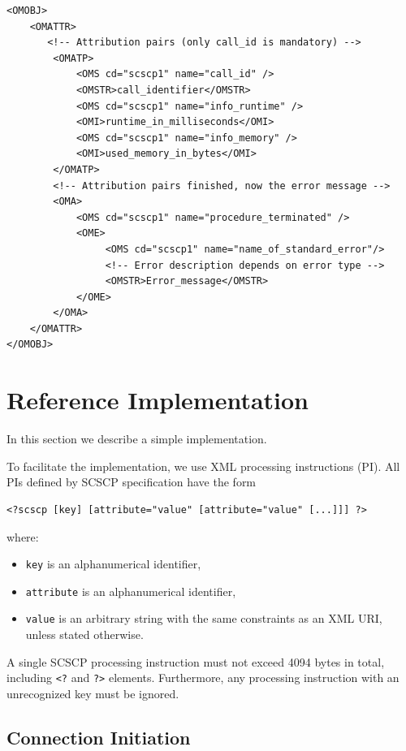 \documentclass{amsart}
\begin{document}
\begin{verbatim}
<OMOBJ>
    <OMATTR>
       <!-- Attribution pairs (only call_id is mandatory) -->
        <OMATP>
            <OMS cd="scscp1" name="call_id" />
            <OMSTR>call_identifier</OMSTR>
            <OMS cd="scscp1" name="info_runtime" />
            <OMI>runtime_in_milliseconds</OMI>
            <OMS cd="scscp1" name="info_memory" />
            <OMI>used_memory_in_bytes</OMI>
        </OMATP> 
        <!-- Attribution pairs finished, now the error message -->
        <OMA>
            <OMS cd="scscp1" name="procedure_terminated" />
            <OME>
                 <OMS cd="scscp1" name="name_of_standard_error"/>
                 <!-- Error description depends on error type -->
                 <OMSTR>Error_message</OMSTR>
            </OME>
        </OMA>
    </OMATTR>
</OMOBJ>
\end{verbatim}

\section{Reference Implementation}\label{implement}

In this section we describe a simple implementation.

To facilitate the implementation, we use XML processing instructions (PI). 
All PIs defined by SCSCP specification have the form
\begin{verbatim}
<?scscp [key] [attribute="value" [attribute="value" [...]]] ?>
\end{verbatim}
where:
\begin{itemize}
\item {\tt key} is an alphanumerical identifier,
\item {\tt attribute} is an alphanumerical identifier,
\item {\tt value} is an arbitrary string with the same constraints as an XML URI,
unless stated otherwise.
\end{itemize}
A single SCSCP processing instruction must not exceed 4094 bytes 
in total, including \verb|<?| and \verb|?>| elements. 
Furthermore, any processing instruction with an unrecognized key must be ignored.

\subsection{Connection Initiation}
\end{document}

